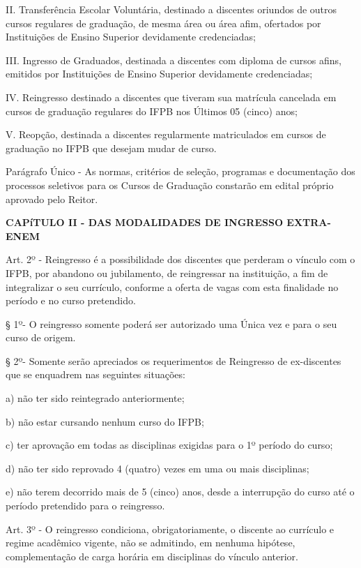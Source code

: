II. Transferência Escolar Voluntária, destinado a discentes oriundos de outros cursos regulares de graduação, de mesma área ou área afim, ofertados por Instituições de Ensino Superior devidamente credenciadas;

III. Ingresso de Graduados, destinada a discentes com diploma de cursos afins, emitidos por Instituições de Ensino Superior devidamente credenciadas;

IV. Reingresso destinado a discentes que tiveram sua matrícula cancelada em cursos de graduação regulares do IFPB nos Últimos 05 (cinco) anos;

V. Reopção, destinada a discentes regularmente matriculados em cursos de graduação no IFPB que desejam mudar de curso.


Parágrafo Único - As normas, critérios de seleção, programas e documentação dos processos seletivos para os Cursos de Graduação constarão em edital próprio aprovado pelo Reitor.

\vspace{4mm}
\textbf{CAPíTULO II - DAS MODALIDADES DE INGRESSO EXTRA-ENEM}
\vspace{4mm}

\vspace{1mm}
Art. 2º - Reingresso é a possibilidade dos discentes que perderam o vínculo com o IFPB, por abandono ou jubilamento, de reingressar na instituição, a fim de integralizar o seu currículo, conforme a oferta de vagas com esta finalidade no período e no curso pretendido.

	§ 1º- O reingresso somente poderá ser autorizado uma Única vez e para o seu curso de origem.

	§ 2º- Somente serão apreciados os requerimentos de Reingresso de ex-discentes que se enquadrem nas seguintes situações:

 a)	não ter sido reintegrado anteriormente;

 b)	não estar cursando nenhum curso do IFPB;

 c)	ter aprovação em todas as disciplinas exigidas para o 1º período do curso;

 d)	não ter sido reprovado 4 (quatro) vezes em uma ou mais disciplinas;

 e)	não terem decorrido mais de 5 (cinco) anos, desde a interrupção do curso até o período pretendido para o reingresso.

\vspace{1mm}
Art. 3º - O reingresso condiciona, obrigatoriamente, o discente ao currículo e regime acadêmico vigente, não se admitindo, em nenhuma hipótese, complementação de carga horária em disciplinas do vínculo anterior.

